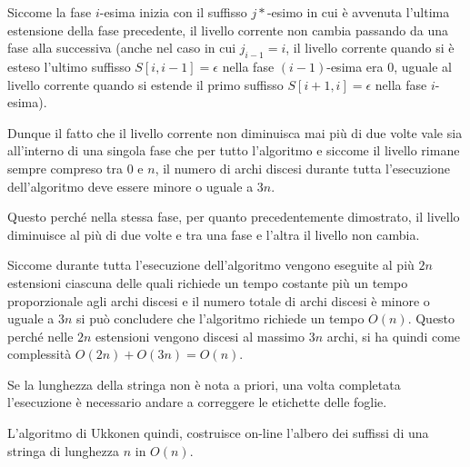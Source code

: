 Siccome la fase $i$-esima inizia con il suffisso $j*$-esimo in cui è avvenuta l'ultima estensione della fase precedente, il livello corrente non cambia passando da una fase alla successiva (anche nel caso in cui $j_{i-1}=i$, il livello corrente quando si è esteso l'ultimo suffisso $S[i,i-1] = \epsilon$ nella fase $(i-1)$-esima era 0, uguale al livello corrente quando si estende il primo suffisso $S[i+1,i] = \epsilon$ nella fase $i$-esima).

Dunque il fatto che il livello corrente non diminuisca mai più di due volte vale sia all'interno di una singola fase che per tutto l'algoritmo e siccome il livello rimane sempre compreso tra 0 e $n$, il numero di archi discesi durante tutta l'esecuzione dell'algoritmo deve essere minore o uguale a $3n$.

Questo perché nella stessa fase, per quanto precedentemente dimostrato, il livello diminuisce al più di due volte e tra una fase e l'altra il livello non cambia.

Siccome durante tutta l'esecuzione dell'algoritmo vengono eseguite al più $2n$ estensioni ciascuna delle quali richiede un tempo costante più un tempo proporzionale agli archi discesi e il numero totale di archi discesi è minore o uguale a $3n$ si può concludere che l'algoritmo richiede un tempo $O(n)$. Questo perché nelle $2n$ estensioni vengono discesi al massimo $3n$ archi, si ha quindi come complessità $O(2n)+ O(3n) = O(n)$.

Se la lunghezza della stringa non è nota a priori, una volta completata l'esecuzione è necessario andare a correggere le etichette delle foglie.

L'algoritmo di Ukkonen quindi, costruisce on-line l'albero dei suffissi di una stringa di lunghezza $n$ in $O(n)$.